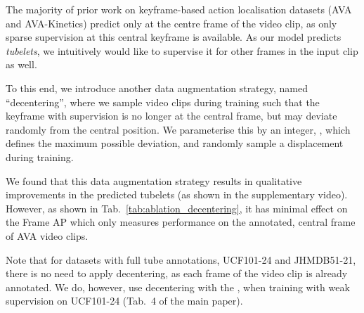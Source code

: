 \documentclass[10pt,twocolumn,letterpaper]{article}
\begin{document}
The majority of prior work on keyframe-based action localisation datasets (\eg AVA and AVA-Kinetics) predict only at the centre frame of the video clip, as only sparse supervision at this central keyframe is available.
As our model predicts \textit{tubelets}, we intuitively would like to supervise it for other frames in the input clip as well.

To this end, we introduce another data augmentation strategy, named ``decentering'', where we sample video clips during training such that the keyframe with supervision is no longer at the central frame, but may deviate randomly from the central position.
We parameterise this by an integer, , which defines the maximum possible deviation, and randomly sample a displacement  during training.

We found that this data augmentation strategy results in qualitative improvements in the predicted tubelets (as shown in the supplementary video).
However, as shown in Tab.~\ref{tab:ablation_decentering}, it has minimal effect on the Frame AP which only measures performance on the annotated, central frame of AVA video clips.

Note that for datasets with full tube annotations, \ie UCF101-24 and JHMDB51-21, there is no need to apply decentering, as each frame of the video clip is already annotated.
We do, however, use decentering with the , when training with weak supervision on UCF101-24 (Tab.~4 of the main paper).

    
\end{document}
